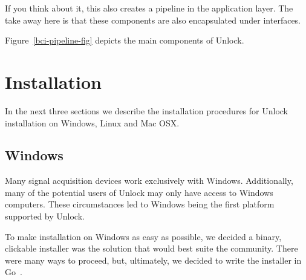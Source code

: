 \documentclass[11pt]{article}
\begin{document}
If you think about it, this also creates a pipeline in the application layer.  The take away here is that these components are also encapsulated under interfaces.

Figure~\ref{bci-pipeline-fig} depicts the main components of Unlock.




\section{Installation}

In the next three sections we describe the installation procedures for Unlock installation on Windows, Linux and Mac OSX.  

\subsection{Windows}

Many signal acquisition devices work exclusively with Windows.  Additionally, many of the potential users of Unlock may only have access to Windows computers.  These circumstances led to Windows being the first platform supported by Unlock.

To make installation on Windows as easy as possible, we decided a binary, clickable installer was the solution that would best suite the community.  There were many ways to proceed, but, ultimately, we decided to write the installer in Go~\cite{golang}.  
\end{document}
